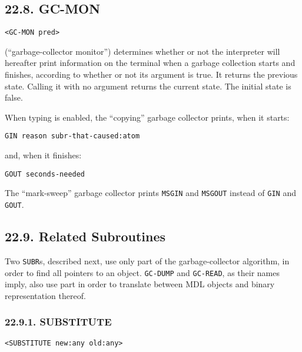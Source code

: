 \documentclass[a4paper,]{article}
\begin{document}
\subsection{22.8. GC-MON}\label{gc-mon}

\begin{verbatim}
<GC-MON pred>
\end{verbatim}

 (``garbage-collector monitor'') determines whether or not the interpreter will hereafter
print information on the terminal when a garbage collection starts and finishes, according to whether or not its argument
is true. It returns the previous state. Calling it with no argument returns the current state. The initial state is false.

When typing is enabled, the ``copying'' garbage collector prints, when it starts:

\begin{verbatim}
GIN reason subr-that-caused:atom
\end{verbatim}

and, when it finishes:

\begin{verbatim}
GOUT seconds-needed
\end{verbatim}

The ``mark-sweep'' garbage collector prints \texttt{MSGIN} and \texttt{MSGOUT} instead of \texttt{GIN} and \texttt{GOUT}.

\subsection{22.9. Related Subroutines}\label{related-subroutines}

Two \texttt{SUBR}s, described next, use only part of the garbage-collector algorithm, in order to find all pointers to an
object. \texttt{GC-DUMP} and \texttt{GC-READ}, as their names imply, also
use part in order to translate between MDL objects and binary representation thereof.

\subsubsection{22.9.1. SUBSTITUTE}\label{substitute}

\begin{verbatim}
<SUBSTITUTE new:any old:any>
\end{verbatim}
\end{document}

